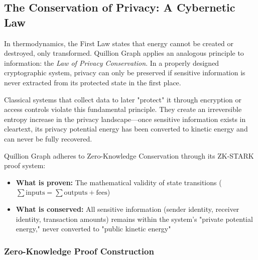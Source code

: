 \documentclass[11pt,a4paper]{article}
\begin{document}
\subsection{The Conservation of Privacy: A Cybernetic Law}

In thermodynamics, the First Law states that energy cannot be created or destroyed, only transformed. Quillion Graph applies an analogous principle to information: the \textit{Law of Privacy Conservation}. In a properly designed cryptographic system, privacy can only be preserved if sensitive information is never extracted from its protected state in the first place.

Classical systems that collect data to later "protect" it through encryption or access controls violate this fundamental principle. They create an irreversible entropy increase in the privacy landscape—once sensitive information exists in cleartext, its privacy potential energy has been converted to kinetic energy and can never be fully recovered.

Quillion Graph adheres to Zero-Knowledge Conservation through its ZK-STARK proof system:

\begin{itemize}
    \item \textbf{What is proven:} The mathematical validity of state transitions ($\sum \text{inputs} = \sum \text{outputs} + \text{fees}$)
    \item \textbf{What is conserved:} All sensitive information (sender identity, receiver identity, transaction amounts) remains within the system's "private potential energy," never converted to "public kinetic energy"
\end{itemize}

\subsubsection{Zero-Knowledge Proof Construction}
\end{document}
